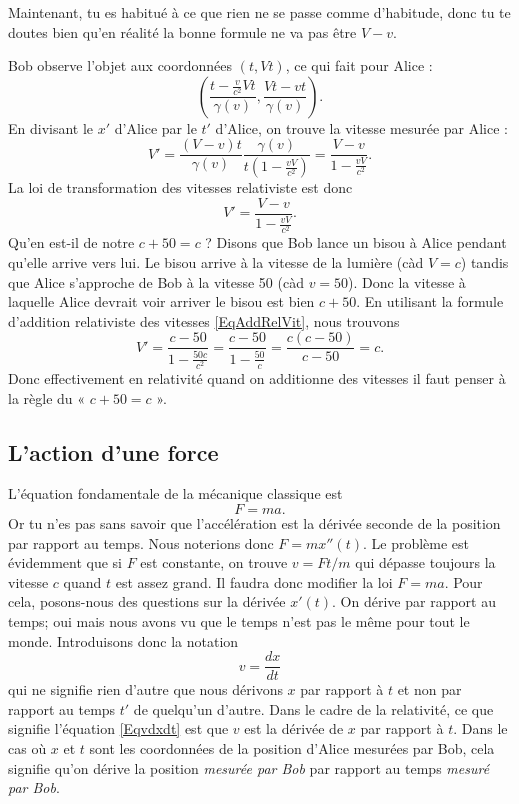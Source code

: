 Maintenant, tu es habitué à ce que rien ne se passe comme d'habitude, donc tu te doutes bien qu'en réalité la bonne formule ne va pas être \( V-v\).

Bob observe l'objet aux coordonnées \( (t,Vt)\), ce qui fait pour Alice :
\[
	\left( \frac{ t-\frac{ v }{ c^2 }Vt }{ \gamma(v) },\frac{ Vt-vt }{ \gamma(v) } \right).
\]
En divisant le \( x'\) d'Alice par le \( t'\) d'Alice, on trouve la vitesse mesurée par Alice :
\[
	V'=\frac{ (V-v)t }{ \gamma(v) }\frac{ \gamma(v) }{ t\left( 1-\frac{ vV }{ c^2 } \right) }=\frac{ V-v }{ 1-\frac{ vV }{ c^2 } }.
\]
La loi de transformation des vitesses relativiste est donc
\begin{equation}	\label{EqAddRelVit}
	V'=\frac{ V-v }{ 1-\frac{ vV }{ c^2 } }.
\end{equation}
Qu'en est-il de notre \( c+50=c\) ? Disons que Bob lance un bisou à Alice pendant qu'elle arrive vers lui. Le bisou arrive à la vitesse de la lumière (càd \( V=c\)) tandis que Alice s'approche de Bob à la vitesse \unit{50}{\meter\per\second} (càd \( v=50\)). Donc la vitesse à laquelle Alice devrait voir arriver le bisou est bien \( c+50\). En utilisant la formule d'addition relativiste des vitesses \eqref{EqAddRelVit}, nous trouvons
\[
	V'=\frac{ c-50 }{ 1-\frac{ 50c }{ c^2 } }=\frac{ c-50 }{ 1-\frac{ 50 }{ c } }=\frac{ c(c-50) }{ c-50 }=c.
\]
Donc effectivement en relativité quand on additionne des vitesses il faut penser à la règle du « \( c+50=c\) ».

\subsection{L'action d'une force}

L'équation fondamentale de la mécanique classique est
\[
	F=ma.
\]
Or tu n'es pas sans savoir que l'accélération est la dérivée seconde de la position par rapport au temps. Nous noterions donc \( F=mx''(t)\). Le problème est évidemment que si \( F\) est constante, on trouve \( v=Ft/m\) qui dépasse toujours la vitesse \( c\) quand \( t\) est assez grand. Il faudra donc modifier la loi \( F=ma\). Pour cela, posons-nous des questions sur la dérivée \( x'(t)\). On dérive par rapport au temps; oui mais nous avons vu que le temps n'est pas le même pour tout le monde. Introduisons donc la notation
\begin{equation}	\label{Eqvdxdt}
	v=\frac{ dx }{ dt }
\end{equation}
qui ne signifie rien d'autre que nous dérivons \( x\) par rapport à \( t\) et non par rapport au temps \( t'\) de quelqu'un d'autre. Dans le cadre de la relativité, ce que signifie l'équation \eqref{Eqvdxdt} est que \( v\) est la dérivée de \( x\) par rapport à \( t\). Dans le cas où \( x\) et \( t\) sont les coordonnées de la position d'Alice mesurées par Bob, cela signifie qu'on dérive la position \emph{mesurée par Bob} par rapport au temps \emph{mesuré par Bob}.

